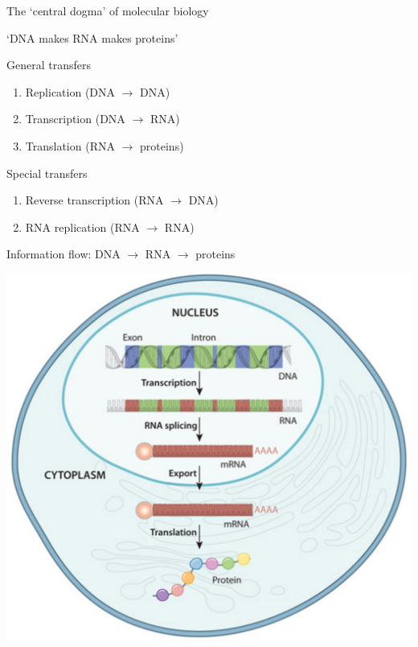 \begin{frame}{The `central dogma' of molecular biology}
    \begin{center}
        \large%
        \alert{`DNA makes RNA makes proteins'}
    \end{center}
    \vfill
    \begin{block}{General transfers}
        \begin{enumerate}
            \item Replication (DNA $\rightarrow$ DNA)
            \item Transcription (DNA $\rightarrow$ RNA)
            \item Translation (RNA $\rightarrow$ proteins)
        \end{enumerate}
    \end{block}
    \vfill
    \begin{block}{Special transfers}
        \begin{enumerate}
            \item Reverse transcription (RNA $\rightarrow$ DNA)
            \item RNA replication (RNA $\rightarrow$ RNA)
        \end{enumerate}
    \end{block}
\end{frame}

\begin{frame}{Information flow: DNA $\rightarrow$ RNA $\rightarrow$ proteins}
    \begin{center}
        \includegraphics[height=0.9\textheight]{figures/information_flow}
    \end{center}
\end{frame}

